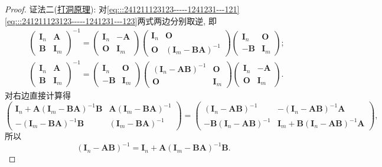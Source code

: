 \documentclass[../../main.tex]{subfiles}%
\begin{document}
\begin{proof}
{\color{blue}证法二(\hyperref[proposition:打洞原理]{打洞原理}):}
对\eqref{eq:::241211123123-----1241231---121}\eqref{eq:::241211123123-----1241231---123}两式两边分别取逆, 即
\begin{align*}
&\begin{pmatrix} \boldsymbol{I}_n & \boldsymbol{A} \\ \boldsymbol{B} & \boldsymbol{I}_m \end{pmatrix}^{-1} = \begin{pmatrix} \boldsymbol{I}_n & -\boldsymbol{A} \\ \boldsymbol{O} & \boldsymbol{I}_m \end{pmatrix} \begin{pmatrix} \boldsymbol{I}_n & \boldsymbol{O} \\ \boldsymbol{O} & (\boldsymbol{I}_m - \boldsymbol{BA})^{-1} \end{pmatrix} \begin{pmatrix} \boldsymbol{I}_n & \boldsymbol{O} \\ -\boldsymbol{B} & \boldsymbol{I}_m \end{pmatrix};
\\
&\begin{pmatrix} \boldsymbol{I}_n & \boldsymbol{A} \\ \boldsymbol{B} & \boldsymbol{I}_m \end{pmatrix}^{-1} 
= \begin{pmatrix} \boldsymbol{I}_n & \boldsymbol{O} \\ -\boldsymbol{B} & \boldsymbol{I}_m \end{pmatrix} \begin{pmatrix} (\boldsymbol{I}_n - \boldsymbol{AB})^{-1} & \boldsymbol{O} \\ \boldsymbol{O} & \boldsymbol{I}_m \end{pmatrix} \begin{pmatrix} \boldsymbol{I}_n & -\boldsymbol{A} \\ \boldsymbol{O} & \boldsymbol{I}_m \end{pmatrix}.
\end{align*}
对右边直接计算得
\[
\begin{pmatrix} \boldsymbol{I}_n + \boldsymbol{A}(\boldsymbol{I}_m - \boldsymbol{BA})^{-1}\boldsymbol{B} & \boldsymbol{A}(\boldsymbol{I}_m - \boldsymbol{BA})^{-1} \\ -(\boldsymbol{I}_m - \boldsymbol{BA})^{-1}\boldsymbol{B} & (\boldsymbol{I}_m - \boldsymbol{BA})^{-1} \end{pmatrix}
= \begin{pmatrix} (\boldsymbol{I}_n - \boldsymbol{AB})^{-1} & -(\boldsymbol{I}_n - \boldsymbol{AB})^{-1}\boldsymbol{A} \\ -\boldsymbol{B}(\boldsymbol{I}_n - \boldsymbol{AB})^{-1} & \boldsymbol{I}_m + \boldsymbol{B}(\boldsymbol{I}_n - \boldsymbol{AB})^{-1}\boldsymbol{A} \end{pmatrix},
\]
所以
\[
(\boldsymbol{I}_n - \boldsymbol{AB})^{-1} = \boldsymbol{I}_n + \boldsymbol{A}(\boldsymbol{I}_m - \boldsymbol{BA})^{-1}\boldsymbol{B}.
\]
\end{proof}
\end{document}

